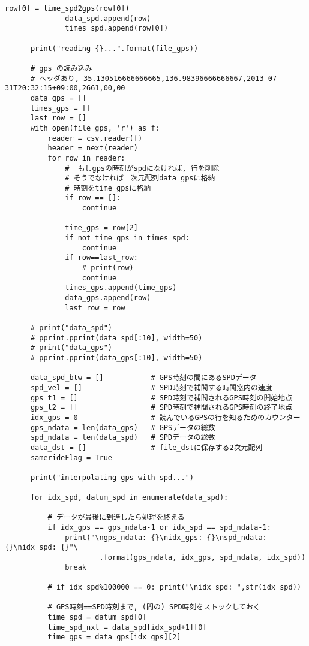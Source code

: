 \documentclass[twocolumn, a4paper, 9pt]{jarticle}
\begin{document}
\begin{lstlisting}[caption=spdgps.py, label=spdgps]
              row[0] = time_spd2gps(row[0])
              data_spd.append(row)
              times_spd.append(row[0])
  
      print("reading {}...".format(file_gps))
  
      # gps の読み込み
      # ヘッダあり, 35.130516666666665,136.98396666666667,2013-07-31T20:32:15+09:00,2661,00,00
      data_gps = []
      times_gps = []
      last_row = []
      with open(file_gps, 'r') as f:
          reader = csv.reader(f)
          header = next(reader)
          for row in reader:
              #  もしgpsの時刻がspdになければ, 行を削除
              # そうでなければ二次元配列data_gpsに格納
              # 時刻をtime_gpsに格納
              if row == []:
                  continue
  
              time_gps = row[2]
              if not time_gps in times_spd:
                  continue
              if row==last_row:
                  # print(row)
                  continue
              times_gps.append(time_gps)
              data_gps.append(row)
              last_row = row
  
      # print("data_spd")
      # pprint.pprint(data_spd[:10], width=50)
      # print("data_gps")
      # pprint.pprint(data_gps[:10], width=50)
  
      data_spd_btw = []           # GPS時刻の間にあるSPDデータ
      spd_vel = []                # SPD時刻で補間する時間窓内の速度
      gps_t1 = []                 # SPD時刻で補間されるGPS時刻の開始地点
      gps_t2 = []                 # SPD時刻で補間されるGPS時刻の終了地点
      idx_gps = 0                 # 読んでいるGPSの行を知るためのカウンター
      gps_ndata = len(data_gps)   # GPSデータの総数
      spd_ndata = len(data_spd)   # SPDデータの総数
      data_dst = []               # file_dstに保存する2次元配列
      samerideFlag = True
  
      print("interpolating gps with spd...")
  
      for idx_spd, datum_spd in enumerate(data_spd):
  
          # データが最後に到達したら処理を終える
          if idx_gps == gps_ndata-1 or idx_spd == spd_ndata-1:
              print("\ngps_ndata: {}\nidx_gps: {}\nspd_ndata: {}\nidx_spd: {}"\
                      .format(gps_ndata, idx_gps, spd_ndata, idx_spd))
              break
  
          # if idx_spd%100000 == 0: print("\nidx_spd: ",str(idx_spd))
  
          # GPS時刻==SPD時刻まで, (間の) SPD時刻をストックしておく
          time_spd = datum_spd[0]
          time_spd_nxt = data_spd[idx_spd+1][0]
          time_gps = data_gps[idx_gps][2]
  

\end{lstlisting}
\end{document}

